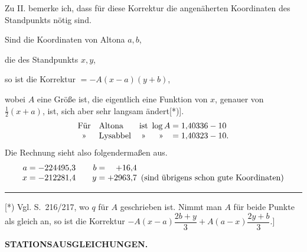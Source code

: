 Zu II. bemerke ich, dass für diese Korrektur die angenäherten Koordinaten des Standpunkts nötig sind.

Sind die Koordinaten von Altona \(a,b\),\par
die des Standpunkts \(x,y\),\par
so ist die Korrektur \(=-A(x-a)(y+b)\),\par
\noindent wobei \(A\) eine Größe ist, die eigentlich eine Funktion von \(x\), genauer von \(\frac12(x+a)\), ist, sich aber sehr langsam ändert[*)].
\[
\begin{array}{@{}c@{\quad}l@{\quad}c@{\enspace}c@{\;=\;}l@{}}
 \text{Für}&\text{Altona}&\text{ist}&\log A&1{,}40336-10\\
 \text{»}&\text{Lysabbel}&\text{»}&\text{»}&1{,}40323-10.
\end{array}
\]
\indent Die Rechnung sieht also folgendermaßen aus.
\[
\begin{array}{@{}r@{\;=\;}r@{\qquad}r@{\;=\;}r@{\enspace}l@{}}
 a&-224495{,}3&b&+16{,}4&\\
 x&-212281{,}4&y&+2963{,}7&\text{(sind übrigens schon gute Koordinaten)}
\end{array}
\]

\par\smallskip\noindent\rule{4cm}{.4pt}\par
{\footnotesize\noindent\hspace*{\parindent}[*) Vgl. S.~216/217, wo \(q\) für \(A\) geschrieben ist. Nimmt man \(A\) für beide Punkte als gleich an, so ist die Korrektur \(-A(x-a)\dfrac{2b+y}{3}+A(a-x)\dfrac{2y+b}{3}\).]\par}

\par\clearpage
\noindent\null\hfill{\small\textbf{STATIONSAUSGLEICHUNGEN.}}\hfill{}\par\medskip

